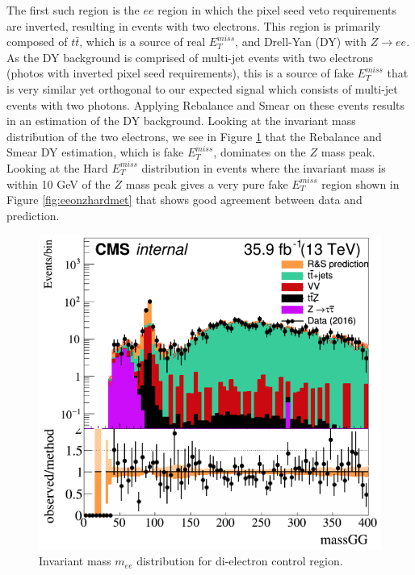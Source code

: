 The first such region is the $ee$ region in which the pixel seed veto requirements are inverted, resulting in events with two electrons.  This region is primarily composed of $t\bar{t}$, which is a source of real $E_T^{miss}$, and Drell-Yan (DY) with $Z\rightarrow ee$.  As the DY background is comprised of multi-jet events with two electrons (photos with inverted pixel seed requirements), this is a source of fake $E_T^{miss}$ that is very similar yet orthogonal to our expected signal which consists of multi-jet events with two photons.  Applying Rebalance and Smear on these events results in an estimation of the DY background.  Looking at the invariant mass distribution of the two electrons, we see in Figure \ref{fig:eefakemet} that the Rebalance and Smear DY estimation, which is fake $E_T^{miss}$, dominates on the $Z$ mass peak.  Looking at the Hard $E_T^{miss}$ distribution in events where the invariant mass is within 10 GeV of the $Z$ mass peak gives a very pure fake $E_T^{miss}$ region shown in Figure \ref{fig:eeonzhardmet} that shows good agreement between data and prediction.
\begin{figure}[h]
	\centering
	\includegraphics[width=0.9\linewidth]{Figures/eefakemet}
	\caption[Invariant mass $m_{ee}$ distribution for di-electron control region.]{Invariant mass $m_{ee}$ distribution for di-electron control region.}
	\label{fig:eefakemet}
\end{figure}
